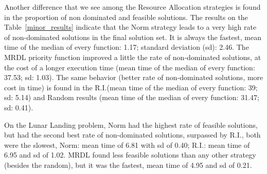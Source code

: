 Another difference that we see among the Resource Allocation strategies is found in the proportion of non dominated and feasible solutions. The results on the Table~\ref{minor_results} indicate that the Norm strategy leads to a very high rate of non-dominated solutions in the final solution set. It is always the fastest, mean time of the median of every function: 1.17; standard deviation (sd): 2.46. The MRDL priority function improved a little the rate of non-dominated solutions, at the cost of a longer execution time (mean time of the median of every function: 37.53; sd: 1.03). The same behavior (better rate of non-dominated solutions, more cost in time) is found in the R.I.(mean time of the median of every function: 39; sd: 5.14) and Random results (mean time of the median of every function: 31.47; sd: 0.41).

On the Lunar Landing problem, Norm had the highest rate of feasible solutions, but had the second best rate of non-dominated solutions, surpassed by R.I., both were the slowest, Norm: mean time of 6.81 with sd of 0.40; R.I.: mean time of 6.95 and sd of 1.02. MRDL found less feasible solutions than any other strategy (besides the random), but it was the fastest, mean time of 4.95 and sd of 0.21.











